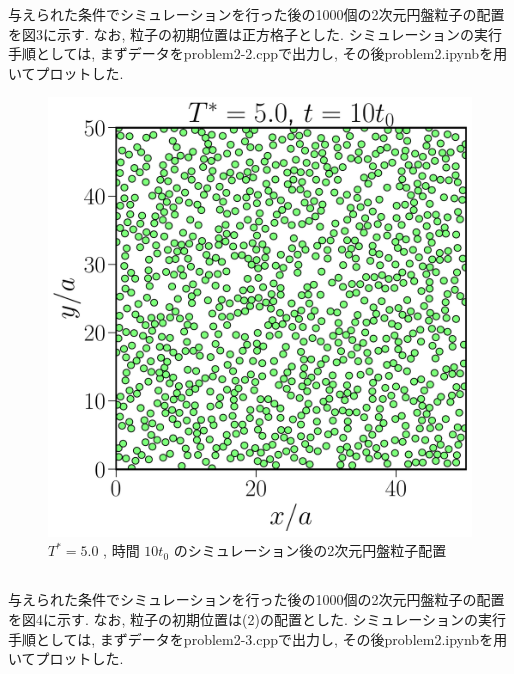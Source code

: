 \documentclass[a4paper,dvipdfmx]{jarticle}
\begin{document}
\noindent
与えられた条件でシミュレーションを行った後の1000個の2次元円盤粒子の配置を図3に示す.
なお, 粒子の初期位置は正方格子とした.
シミュレーションの実行手順としては, まずデータをproblem2-2.cppで出力し, 
その後problem2.ipynbを用いてプロットした.

\begin{figure}[H]
    \centering
    \includegraphics[scale=0.6]{problem_2/2-2/problem2-2.pdf}
    \caption{$T^*=5.0$ , 時間 $10t_0$ のシミュレーション後の2次元円盤粒子配置}
\end{figure}

\subsection{}
\noindent
与えられた条件でシミュレーションを行った後の1000個の2次元円盤粒子の配置を図4に示す.
なお, 粒子の初期位置は(2)の配置とした.
シミュレーションの実行手順としては, まずデータをproblem2-3.cppで出力し, 
その後problem2.ipynbを用いてプロットした.
\end{document}
